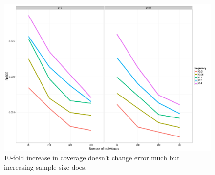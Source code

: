 \documentclass[]{article}
\begin{document}
\begin{figure}[b]
\centering
\includegraphics[width=\textwidth]{pdf/figS4}
\caption{10-fold increase in coverage doesn't change error much but increasing sample size does.}
\end{figure}
\end{document}
